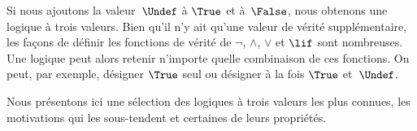 \documentclass[../../../include/open-logic-section]{subfiles}
\begin{document}


Si nous ajoutons la valeur~$\Undef$ à
$\True$ et à~$\False$, nous obtenons
une logique à trois valeurs. Bien qu'il
n'y ait qu'une valeur de vérité
supplémentaire, les façons de définir
les fonctions de vérité de $\lnot$,
$\land$, $\lor$ et $\lif$ sont
nombreuses. Une logique peut alors
retenir n'importe quelle combinaison
de ces fonctions. On peut, par exemple, désigner $\True$ seul
ou désigner à la fois $\True$ et~$\Undef$.

Nous présentons ici une sélection des
logiques à trois valeurs les plus
connues, les motivations qui les
sous-tendent et certaines de leurs
propriétés.
\end{document}
